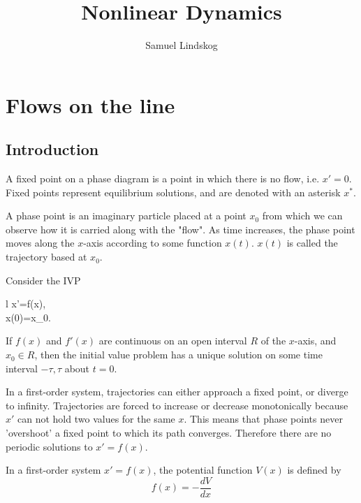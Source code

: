 \documentclass{article}
\title{Nonlinear Dynamics}
\author{Samuel Lindskog}
\begin{document}
\maketitle
{}
\tableofcontents
{}
\clearpage
{}
\setcounter{page}{1}

\section{Flows on the line}
\subsection{Introduction}
\begin{definition}
	A fixed point on a phase diagram is a point in which there is no flow, i.e. \(x'=0\). Fixed points represent equilibrium solutions, and are denoted with an asterisk \(x^*\).
\end{definition}
\begin{definition}
	A phase point is an imaginary particle placed at a point \(x_0\) from which we can observe how it is carried along with the "flow". As time increases, the phase point moves along the \(x\)-axis according to some function \(x(t)\). \(x(t)\) is called the trajectory based at \(x_0\).
\end{definition}
\begin{theorem}
	Consider the IVP
	\begin{IEEEeqnarray*}{l}
		x'=f(x),\\
		x(0)=x_0.
	\end{IEEEeqnarray*}
	If \(f(x)\) and \(f'(x)\) are continuous on an open interval \(R\) of the \(x\)-axis, and \(x_0\in R\), then the initial value problem has a unique solution on some time interval \(-\tau,\tau\) about \(t=0\).
\end{theorem}
\begin{remark}
	In a first-order system, trajectories can either approach a fixed point, or diverge to infinity. Trajectories are forced to increase or decrease monotonically because \(x'\) can not hold two values for the same \(x\). This means that phase points never 'overshoot' a fixed point to which its path converges. Therefore there are no periodic solutions to \(x'=f(x)\).
\end{remark}
\begin{definition}[Potentials]
	In a first-order system \(x'=f(x)\), the potential function \(V(x)\) is defined by
	\begin{equation*}
		f(x)=-\frac{dV}{dx}
	\end{equation*}
\end{definition}
\end{document}
